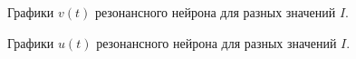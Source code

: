\begin{figure}[h]
	\caption{Графики $v(t)$ резонансного нейрона для разных значений $I$.}
	\label{rz_different_I_potentials}
\end{figure}

\begin{figure}[h]
	\caption{Графики $u(t)$ резонансного нейрона для разных значений $I$.}
	\label{rz_different_I_recovery}
\end{figure}

